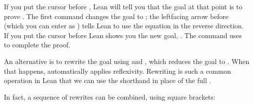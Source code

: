 \documentclass[letterpaper,10pt,english]{sphinxmanual}
\begin{document}
\sphinxAtStartPar
If you put the cursor before ,
Lean will tell you that the goal at that point is to prove .
The first command changes the goal  to ;
the left\sphinxhyphen{}facing arrow before  (which you can enter as \sphinxcode{\sphinxupquote{\textbackslash{}<\sphinxhyphen{}}})
tells Lean to use the equation in the reverse direction.
If you put the cursor before 
Lean shows you the new goal, .
The  command uses  to complete the proof.

\sphinxAtStartPar
An alternative is to rewrite the goal using  and ,
which reduces the goal to .
When that happens,  automatically applies reflexivity.
Rewriting is such a common operation in Lean that we can use the shorthand
 in place of the full .

\begin{sphinxVerbatim}[commandchars=\\\{\}]
              
            
   \PYG{o}{[}\PYG{o}{]}
   \PYG{o}{[}\PYG{o}{]}
\end{sphinxVerbatim}

\sphinxAtStartPar
In fact, a sequence of rewrites can be combined, using square brackets:

\begin{sphinxVerbatim}[commandchars=\\\{\}]
              
            
   \PYG{o}{[} \PYG{o}{]}
\end{sphinxVerbatim}
\end{document}
